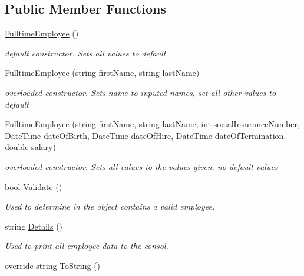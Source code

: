 \subsection*{Public Member Functions}
\begin{DoxyCompactItemize}
\item 
\hyperlink{class_all_employees_1_1_fulltime_employee_a2f7744fed20aa3161c5ac5cd37c1a281}{Fulltime\+Employee} ()
\begin{DoxyCompactList}\small\item\em default constructor. Sets all values to default \end{DoxyCompactList}\item 
\hyperlink{class_all_employees_1_1_fulltime_employee_a7cc8db6b3e7dd2fa71706c9ebaf68660}{Fulltime\+Employee} (string first\+Name, string last\+Name)
\begin{DoxyCompactList}\small\item\em overloaded constructor. Sets name to inputed names, set all other values to default \end{DoxyCompactList}\item 
\hyperlink{class_all_employees_1_1_fulltime_employee_a45c638281476043129e38c74bc16619f}{Fulltime\+Employee} (string first\+Name, string last\+Name, int social\+Insurance\+Number, Date\+Time date\+Of\+Birth, Date\+Time date\+Of\+Hire, Date\+Time date\+Of\+Termination, double salary)
\begin{DoxyCompactList}\small\item\em overloaded constructor. Sets all values to the values given. no default values \end{DoxyCompactList}\item 
bool \hyperlink{class_all_employees_1_1_fulltime_employee_a3e718749e4730c0f2a28f820530071da}{Validate} ()
\begin{DoxyCompactList}\small\item\em Used to determine in the object contains a valid employee. \end{DoxyCompactList}\item 
string \hyperlink{class_all_employees_1_1_fulltime_employee_a7660032e944e78c6ff26598aa7107796}{Details} ()
\begin{DoxyCompactList}\small\item\em Used to print all employee data to the consol. \end{DoxyCompactList}\item 
override string \hyperlink{class_all_employees_1_1_fulltime_employee_a3026e5a4c764fc0da54873cc131e2b82}{To\+String} ()

\end{DoxyCompactItemize}
